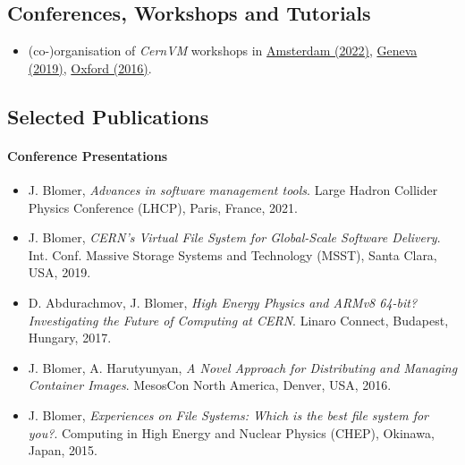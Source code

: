 \subsection*{Conferences, Workshops and Tutorials}

\begin{itemize}

\item[] (co-)organisation of \emph{CernVM} workshops in
    \href{https://indico.cern.ch/event/1079490}{Amsterdam (2022)},
        \href{https://indico.cern.ch/event/757415/}{Geneva (2019)},
        \href{https://indico.cern.ch/event/469775/}{Oxford (2016)}.

\end{itemize}

\subsection*{Selected Publications}

\paragraph{Conference Presentations}

\begin{itemize}

\item[] J. Blomer, \emph{Advances in software management tools}. Large Hadron Collider Physics Conference (LHCP), Paris, France, 2021.

\item[] J. Blomer, \emph{CERN’s Virtual File System for Global-Scale Software Delivery}. Int. Conf. Massive Storage Systems and Technology (MSST), Santa Clara, USA, 2019.

\item[] D. Abdurachmov, J. Blomer,
\emph{High Energy Physics and ARMv8 64-bit? Investigating the Future of Computing at CERN}.
Linaro Connect, Budapest, Hungary, 2017.

\item[] J. Blomer, A. Harutyunyan, \emph{A Novel Approach for Distributing and Managing Container Images}. MesosCon North America, Denver, USA, 2016.

\item[] J. Blomer, \emph{Experiences on File Systems: Which is the best file system for you?}. Computing in High Energy and Nuclear Physics (CHEP), Okinawa, Japan, 2015.


\end{itemize}

